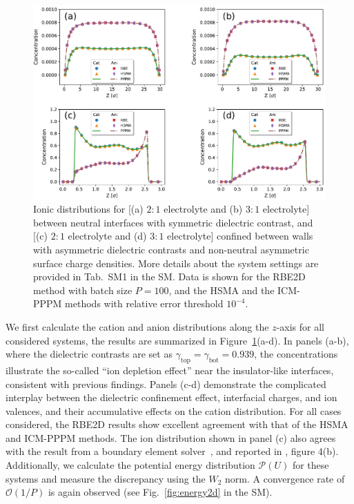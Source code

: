 \begin{figure}[ht!]
\centering
	\includegraphics[width=0.95\linewidth]{figs/DistributionDie.pdf}
	\caption{Ionic distributions for [(a) $2:1$ electrolyte and (b) $3:1$ electrolyte] between neutral interfaces with symmetric dielectric contrast, and [(c) $2:1$ electrolyte and (d) $3:1$ electrolyte] confined between walls with asymmetric dielectric contrasts and non-neutral asymmetric surface charge densities. More details about the system settings are provided in Tab.~SM1 in the SM. 
    Data   {is} shown for the RBE2D method with batch size $P=100$, and the HSMA and the ICM-PPPM methods with relative error threshold $10^{-4}$.} 
	\label{fig:den1}
\end{figure}

We first calculate the cation and anion distributions along  {the} $z$-axis for all considered systems, the results are summarized in Figure~\ref{fig:den1}(a-d). 
In panels (a-b), where the dielectric contrasts are set as $\gamma_{\text{top}}=\gamma_{\text{bot}}=0.939$, the concentrations illustrate the so-called ``ion depletion effect'' near the insulator-like interfaces, consistent with previous findings. 
Panels (c-d) demonstrate the complicated interplay between the dielectric confinement effect, interfacial charges, and ion valences, and their accumulative effects on the cation distribution. %
For all cases considered, the RBE2D results show excellent agreement with that of the HSMA and ICM-PPPM methods. 
The ion distribution shown in panel (c) also agrees with the result from a boundary element solver~\cite{wu2018asymmetric}, and reported in \cite{yuan2021particle}, figure 4(b). 
Additionally, we calculate the potential energy distribution $\mathscr{P}(U)$ for these systems and measure the discrepancy using the $W_2$ norm.
A convergence rate of $\mathcal{O}(1/P)$ is again observed (see Fig.~\ref{fig:energy2d} in the SM).

